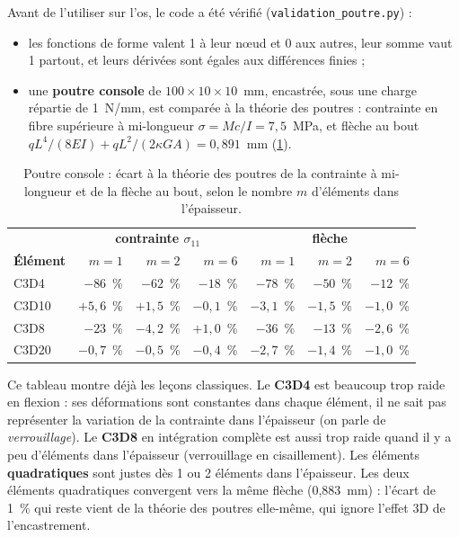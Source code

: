 \documentclass[11pt,a4paper]{article}
\newcommand{\fichier}[1]{\texttt{\small #1}}
\begin{document}
Avant de l'utiliser sur l'os, le code a été vérifié (\fichier{validation\_poutre.py}) :
\begin{itemize}
  \item les fonctions de forme valent 1 à leur nœud et 0 aux autres, leur somme vaut 1 partout, et leurs dérivées sont
  égales aux différences finies ;
  \item une \textbf{poutre console} de $100 \times 10 \times 10$~mm, encastrée, sous une charge répartie de 1~N/mm, est
  comparée à la théorie des poutres : contrainte en fibre supérieure à mi-longueur
  $\sigma = M c / I = 7{,}5$~MPa, et flèche au bout $q L^4 / (8EI) + q L^2 / (2\kappa G A) = 0{,}891$~mm
  (\cref{tab-poutre}).
\end{itemize}

\begin{table}[h]
\centering\small
\caption{Poutre console : écart à la théorie des poutres de la contrainte à mi-longueur et de la flèche au bout,
selon le nombre $m$ d'éléments dans l'épaisseur.}
\label{tab-poutre}
\begin{tabular}{lrrrrrr}
\toprule
& \multicolumn{3}{c}{\textbf{contrainte $\sigma_{11}$}} & \multicolumn{3}{c}{\textbf{flèche}} \\
\textbf{Élément} & $m = 1$ & $m = 2$ & $m = 6$ & $m = 1$ & $m = 2$ & $m = 6$ \\
\midrule
C3D4 & $-86$~\% & $-62$~\% & $-18$~\% & $-78$~\% & $-50$~\% & $-12$~\% \\
C3D10 & $+5{,}6$~\% & $+1{,}5$~\% & $-0{,}1$~\% & $-3{,}1$~\% & $-1{,}5$~\% & $-1{,}0$~\% \\
C3D8 & $-23$~\% & $-4{,}2$~\% & $+1{,}0$~\% & $-36$~\% & $-13$~\% & $-2{,}6$~\% \\
C3D20 & $-0{,}7$~\% & $-0{,}5$~\% & $-0{,}4$~\% & $-2{,}7$~\% & $-1{,}4$~\% & $-1{,}0$~\% \\
\bottomrule
\end{tabular}
\end{table}

Ce tableau montre déjà les leçons classiques. Le \textbf{C3D4} est beaucoup trop raide en flexion : ses déformations
sont constantes dans chaque élément, il ne sait pas représenter la variation de la contrainte dans l'épaisseur
(on parle de \emph{verrouillage}). Le \textbf{C3D8} en intégration complète est aussi trop raide quand il y a peu
d'éléments dans l'épaisseur (verrouillage en cisaillement). Les éléments \textbf{quadratiques} sont justes dès 1 ou
2 éléments dans l'épaisseur. Les deux éléments quadratiques convergent vers la même flèche (0,883~mm) : l'écart de 1~\%
qui reste vient de la théorie des poutres elle-même, qui ignore l'effet 3D de l'encastrement.
\end{document}
